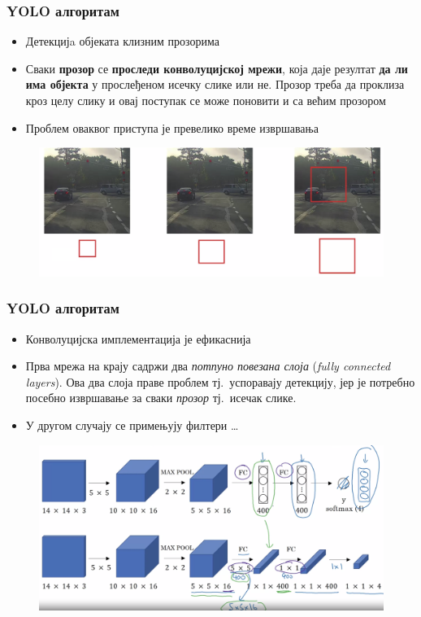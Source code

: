 \begin{frame}
\frametitle{YOLO алгоритам}
\begin{itemize}
 \item \alert{Детекцијa објеката клизним прозорима}
 \item Сваки \textbf{прозор} се \textbf{проследи конволуцијској мрежи},
 која даје резултат \textbf{да ли има објекта} у прослеђеном исечку слике
  или не. \alert{Прозор} треба да \alert{проклиза} кроз целу слику
  и овај поступак се може \alert{поновити и са већим прозором}
  \item Проблем оваквог приступа је \alert{превелико време извршавања}
\end{itemize}
\begin{figure}[H]
  \centering
      \includegraphics[scale=0.18]{slike/slidW.png}
\end{figure}
\end{frame}

\begin{frame}
\frametitle{YOLO алгоритам}
\begin{itemize}
 \item \alert{Конволуцијска имплементација је ефикаснија}
 \item Прва мрежа на крају
  садржи два \textit{потпуно повезана слоја} (\textit{fully connected layers}).
  Ова два слоја праве проблем тј.\ успоравају детекцију, јер је
  потребно посебно извршавање за сваки \textit{прозор} тј.\ исечак слике.
 \item У другом случају се примењују филтери \dots
\end{itemize}
\begin{figure}[H]
  \centering
      \includegraphics[scale=0.18]{slike/ngSlidWConv1.png}
\end{figure}
\end{frame}

